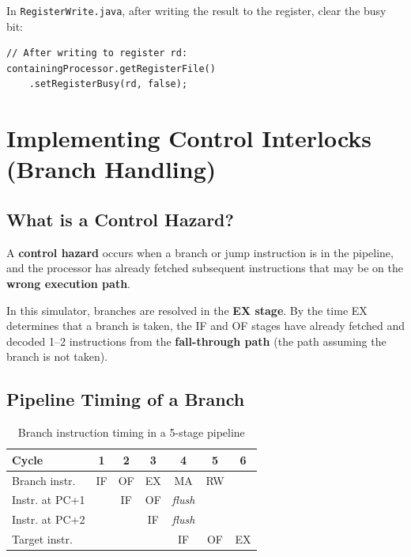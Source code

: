 \documentclass[12pt,a4paper]{article}
\begin{document}
In \texttt{RegisterWrite.java}, after writing the result to the register, clear the busy bit:

\begin{lstlisting}[style=javastyle, caption={Clearing busy bits in RW stage}]
// After writing to register rd:
containingProcessor.getRegisterFile()
    .setRegisterBusy(rd, false);
\end{lstlisting}

\section{Implementing Control Interlocks (Branch Handling)}

\subsection{What is a Control Hazard?}

A \textbf{control hazard} occurs when a branch or jump instruction is in the pipeline, and the processor has already fetched subsequent instructions that may be on the \textbf{wrong execution path}.

In this simulator, branches are resolved in the \textbf{EX stage}. By the time EX determines that a branch is taken, the IF and OF stages have already fetched and decoded 1--2 instructions from the \textbf{fall-through path} (the path assuming the branch is not taken).

\subsection{Pipeline Timing of a Branch}

\begin{table}[H]
\centering
\begin{tabular}{@{}lcccccc@{}}
\toprule
\textbf{Cycle} & \textbf{1} & \textbf{2} & \textbf{3} & \textbf{4} & \textbf{5} & \textbf{6} \\
\midrule
Branch instr. & IF & OF & EX & MA & RW & \\
Instr. at PC+1 & & IF & OF & \textit{flush} & & \\
Instr. at PC+2 & & & IF & \textit{flush} & & \\
Target instr. & & & & IF & OF & EX \\
\bottomrule
\end{tabular}
\caption{Branch instruction timing in a 5-stage pipeline}
\end{table}
\end{document}

